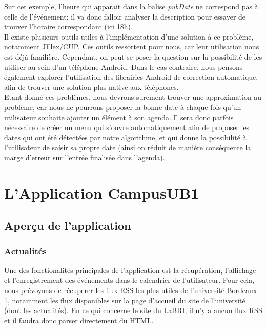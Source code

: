 \documentclass [pdftex,12pt] {report}
\def\wl{\par \vspace{\baselineskip}}
\begin{document}
\wl Sur cet exemple, l'heure qui apparait dans la balise \emph{pubDate} ne correspond pas à celle de l'événement; il va donc falloir analyser la description pour essayer de trouver l'horaire correspondant (ici 18h). \\

Il existe plusieurs outils utiles à l'implémentation d'une solution à ce problème, notamment JFlex/CUP. Ces outils ressortent pour nous, car leur utilisation nous est déjà familière. Cependant, on peut se poser la question sur la possibilité de les utiliser au sein d'un téléphone Android. Dans le cas contraire, nous pensons également explorer l'utilisation des librairies Android de correction automatique, afin de trouver une solution plus native aux téléphones. \\
Etant donné ces problèmes, nous devrons surement trouver une approximation au problème, car nous ne pourrons proposer la bonne date à chaque fois qu'un utilisateur souhaite ajouter un élément à son agenda. Il sera donc parfois nécessaire de créer un menu qui s'ouvre automatiquement afin de proposer les dates qui ont été détectées par notre algorithme, et qui donne la possibilité à l'utilisateur de saisir sa propre date (ainsi on réduit de manière conséquente la marge d'erreur sur l'entrée finalisée dans l'agenda). \\



\chapter{L'Application CampusUB1}
\section{Aperçu de l'application}

\subsection{Actualités}
Une des fonctionalités principales de l'application est la récupération, l'affichage et l'enregistrement des événements dans le calendrier de l'utilisateur. 
Pour cela, nous prévoyons de récuperer les flux RSS les plus utiles de l'université Bordeaux 1\cite{fluxBDX1}, notamment les flux disponibles sur la page d'accueil du site de l'université (dont les actualités).
En ce qui concerne le site du LaBRI, il n'y a aucun flux RSS et il faudra donc parser directement du HTML.
\end{document}
